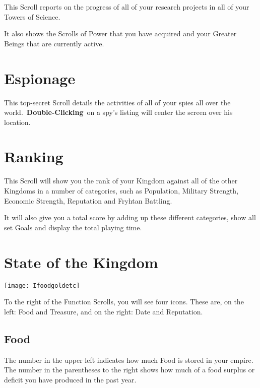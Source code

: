 This Scroll reports on the progress of all of your research projects in all of your Towers of Science.

It also shows the Scrolls of Power that you have acquired and your Greater Beings that are currently active.

\section{Espionage}


This top-secret Scroll details the activities of all of your spies all over the world. \textbf{Double-Clicking} on a spy’s listing will center the screen over his location.

\section{Ranking}


This Scroll will show you the rank of your Kingdom against all of the other Kingdoms in a number of categories, such as Population, Military Strength, Economic Strength, Reputation and Fryhtan Battling.

It will also give you a total score by adding up these different categories, show all set Goals and display the total playing time.

\section{State of the Kingdom}


\begin{center}
	\texttt{[image: Ifoodgoldetc]}
\end{center}

To the right of the Function Scrolls, you will see four icons. These are, on the left: Food and Treasure, and on the right: Date and Reputation.

\subsection{Food}


The number in the upper left indicates how much Food is stored in your empire. The number in the parentheses to the right shows how much of a food surplus or deficit you have produced in the past year.

